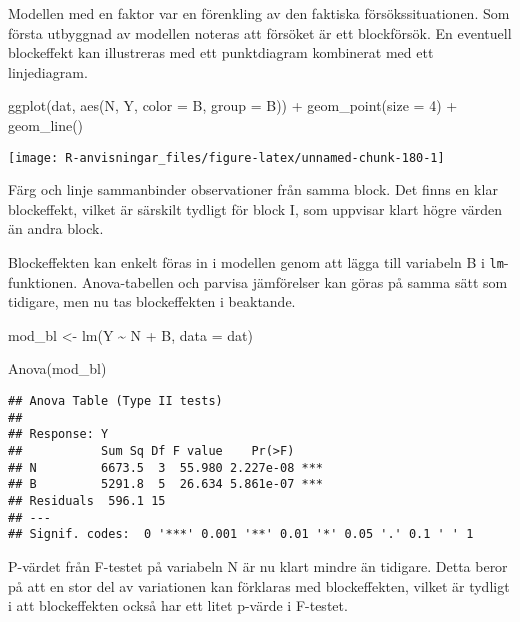\documentclass[
]{book}
\newenvironment{Shaded}{\begin{snugshade}}{\end{snugshade}}
\newcommand{\AttributeTok}[1]{\textcolor[rgb]{0.77,0.63,0.00}{#1}}
\newcommand{\DecValTok}[1]{\textcolor[rgb]{0.00,0.00,0.81}{#1}}
\newcommand{\FunctionTok}[1]{\textcolor[rgb]{0.00,0.00,0.00}{#1}}
\newcommand{\NormalTok}[1]{#1}
\newcommand{\OtherTok}[1]{\textcolor[rgb]{0.56,0.35,0.01}{#1}}
\newcommand{\SpecialCharTok}[1]{\textcolor[rgb]{0.00,0.00,0.00}{#1}}
\theoremstyle{definition}
\theoremstyle{definition}
\theoremstyle{definition}
\theoremstyle{definition}
\theoremstyle{remark}
\begin{document}
Modellen med en faktor var en förenkling av den faktiska försökssituationen. Som första utbyggnad av modellen noteras att försöket är ett blockförsök. En eventuell blockeffekt kan illustreras med ett punktdiagram kombinerat med ett linjediagram.

\begin{Shaded}
\begin{Highlighting}[]
\FunctionTok{ggplot}\NormalTok{(dat, }\FunctionTok{aes}\NormalTok{(N, Y, }\AttributeTok{color =}\NormalTok{ B, }\AttributeTok{group =}\NormalTok{ B)) }\SpecialCharTok{+}
  \FunctionTok{geom\_point}\NormalTok{(}\AttributeTok{size =} \DecValTok{4}\NormalTok{) }\SpecialCharTok{+}
  \FunctionTok{geom\_line}\NormalTok{()}
\end{Highlighting}
\end{Shaded}

\begin{center}\texttt{[image: R-anvisningar\_files/figure-latex/unnamed-chunk-180-1]} \end{center}

Färg och linje sammanbinder observationer från samma block. Det finns en klar blockeffekt, vilket är särskilt tydligt för block I, som uppvisar klart högre värden än andra block.

Blockeffekten kan enkelt föras in i modellen genom att lägga till variabeln B i \texttt{lm}-funktionen. Anova-tabellen och parvisa jämförelser kan göras på samma sätt som tidigare, men nu tas blockeffekten i beaktande.

\begin{Shaded}
\begin{Highlighting}[]
\NormalTok{mod\_bl }\OtherTok{\textless{}{-}} \FunctionTok{lm}\NormalTok{(Y }\SpecialCharTok{\textasciitilde{}}\NormalTok{ N }\SpecialCharTok{+}\NormalTok{ B, }\AttributeTok{data =}\NormalTok{ dat)}

\FunctionTok{Anova}\NormalTok{(mod\_bl)}
\end{Highlighting}
\end{Shaded}

\begin{verbatim}
## Anova Table (Type II tests)
## 
## Response: Y
##           Sum Sq Df F value    Pr(>F)    
## N         6673.5  3  55.980 2.227e-08 ***
## B         5291.8  5  26.634 5.861e-07 ***
## Residuals  596.1 15                      
## ---
## Signif. codes:  0 '***' 0.001 '**' 0.01 '*' 0.05 '.' 0.1 ' ' 1
\end{verbatim}

P-värdet från F-testet på variabeln N är nu klart mindre än tidigare. Detta beror på att en stor del av variationen kan förklaras med blockeffekten, vilket är tydligt i att blockeffekten också har ett litet p-värde i F-testet.
\end{document}
